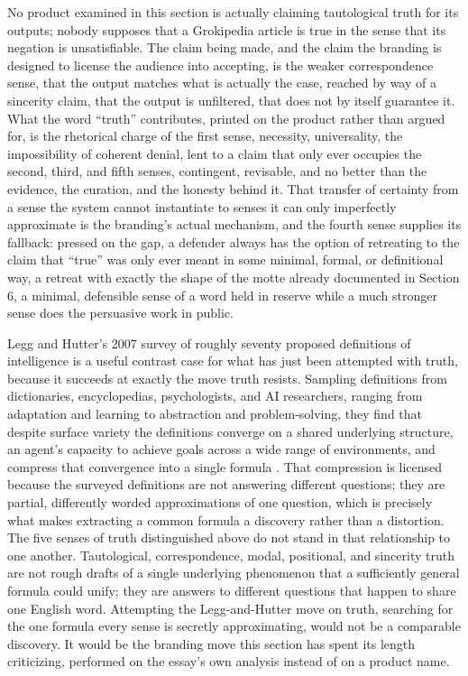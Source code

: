 \documentclass[11pt]{article}
\begin{document}
No product examined in this section is actually claiming tautological truth for its outputs; nobody supposes that a Grokipedia article is true in the sense that its negation is unsatisfiable. The claim being made, and the claim the branding is designed to license the audience into accepting, is the weaker correspondence sense, that the output matches what is actually the case, reached by way of a sincerity claim, that the output is unfiltered, that does not by itself guarantee it. What the word ``truth'' contributes, printed on the product rather than argued for, is the rhetorical charge of the first sense, necessity, universality, the impossibility of coherent denial, lent to a claim that only ever occupies the second, third, and fifth senses, contingent, revisable, and no better than the evidence, the curation, and the honesty behind it. That transfer of certainty from a sense the system cannot instantiate to senses it can only imperfectly approximate is the branding's actual mechanism, and the fourth sense supplies its fallback: pressed on the gap, a defender always has the option of retreating to the claim that ``true'' was only ever meant in some minimal, formal, or definitional way, a retreat with exactly the shape of the motte already documented in Section 6, a minimal, defensible sense of a word held in reserve while a much stronger sense does the persuasive work in public.

Legg and Hutter's 2007 survey of roughly seventy proposed definitions of intelligence is a useful contrast case for what has just been attempted with truth, because it succeeds at exactly the move truth resists. Sampling definitions from dictionaries, encyclopedias, psychologists, and AI researchers, ranging from adaptation and learning to abstraction and problem-solving, they find that despite surface variety the definitions converge on a shared underlying structure, an agent's capacity to achieve goals across a wide range of environments, and compress that convergence into a single formula \citep{legg2007collection}. That compression is licensed because the surveyed definitions are not answering different questions; they are partial, differently worded approximations of one question, which is precisely what makes extracting a common formula a discovery rather than a distortion. The five senses of truth distinguished above do not stand in that relationship to one another. Tautological, correspondence, modal, positional, and sincerity truth are not rough drafts of a single underlying phenomenon that a sufficiently general formula could unify; they are answers to different questions that happen to share one English word. Attempting the Legg-and-Hutter move on truth, searching for the one formula every sense is secretly approximating, would not be a comparable discovery. It would be the branding move this section has spent its length criticizing, performed on the essay's own analysis instead of on a product name.
\end{document}
